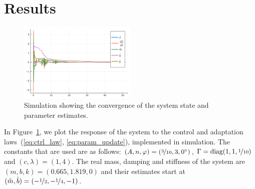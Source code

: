 \section{Results}
\label{sec:results}

\begin{figure}[b]
  \centering
  \includegraphics[width=0.5\textwidth]{./figures/adaptationrule2.pdf}
  \caption{Simulation showing the convergence of the system state and parameter
  estimates.}
  \label{fig:adaptation}
\end{figure}

In Figure~\ref{fig:adaptation}, we plot the response of the system to the
control and adaptation laws~(\ref{eq:ctrl_law}, \ref{eq:param_update}),
implemented in simulation. The constants that are used are as follows: $(A, n,
\varphi) = (\nicefrac{3}{10}, 3, 0^\circ)$, $\Gamma = \text{diag}{(1, 1,
\nicefrac{1}{10})}$ and $(c, \lambda) = (1, 4)$. The real mass, damping and
stiffness of the system are $(m, b, k) = (0.665, 1.819, 0)$ and their estimates
start at $(\hat{m}, \hat{b}) = (-\nicefrac{1}{2}, -\nicefrac{1}{4}, -1)$.
